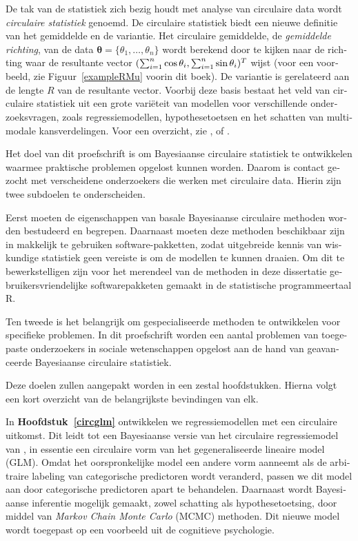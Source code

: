 \documentclass[12pt, a4paper]{book}\usepackage[]{graphicx}\usepackage{xcolor}
\let\proglang=\textsf
\begin{document}
\begin{otherlanguage}{dutch}
De tak van de statistiek zich bezig houdt met analyse van circulaire data wordt \textit{circulaire statistiek} genoemd. De circulaire statistiek biedt een nieuwe definitie van het gemiddelde en de variantie. Het circulaire gemiddelde, de \textit{gemiddelde richting}, van de data $\boldsymbol{\theta} = \{\theta_1, \dots, \theta_n\}$ wordt berekend door te kijken naar de richting waar de resultante vector $(\sum_{i=1}^n\cos\theta_i, \sum_{i=1}^n\sin\theta_i)^T$ wijst (voor een voorbeeld, zie Figuur~\ref{exampleRMu} voorin dit boek). De variantie is gerelateerd aan de lengte $R$ van de resultante vector. Voorbij deze basis bestaat het veld van circulaire statistiek uit een grote vari\"eteit van modellen voor verschillende onderzoeksvragen, zoals regressiemodellen, hypothesetoetsen en het schatten van multimodale kansverdelingen. Voor een overzicht, zie \citet{fisher1995statistical}, \citet{mardia2009directional} of \citet{pewsey2013circular}.

Het doel van dit proefschrift is om Bayesiaanse circulaire statistiek te ontwikkelen waarmee praktische problemen opgelost kunnen worden. Daarom is contact gezocht met verscheidene onderzoekers die werken met circulaire data. Hierin zijn twee subdoelen te onderscheiden.

Eerst moeten de eigenschappen van basale Bayesiaanse circulaire methoden worden bestudeerd en begrepen. Daarnaast moeten deze methoden beschikbaar zijn in makkelijk te gebruiken software-pakketten, zodat uitgebreide kennis van wiskundige statistiek geen vereiste is om de modellen te kunnen draaien. Om dit te bewerkstelligen zijn voor het merendeel van de methoden in deze dissertatie gebruikersvriendelijke softwarepakketen gemaakt in de statistische programmeertaal \proglang{R}.

Ten tweede is het belangrijk om gespecialiseerde methoden te ontwikkelen voor specifieke problemen. In dit proefschrift worden een aantal problemen van toegepaste onderzoekers in sociale wetenschappen opgelost aan de hand van geavanceerde Bayesiaanse circulaire statistiek.

Deze doelen zullen aangepakt worden in een zestal hoofdstukken. Hierna volgt een kort overzicht van de belangrijkste bevindingen van elk.

In \textbf{Hoofdstuk~\ref{circglm}} ontwikkelen we regressiemodellen met een circulaire uitkomst. Dit leidt tot een Bayesiaanse versie van het circulaire regressiemodel van \citet{fisher1992regression}, in essentie een circulaire vorm van het gegeneraliseerde lineaire model (GLM). Omdat het oorspronkelijke model een andere vorm aanneemt als de arbitraire labeling van categorische predictoren wordt veranderd, passen we dit model aan door categorische predictoren apart te behandelen. Daarnaast wordt Bayesiaanse inferentie mogelijk gemaakt, zowel schatting als hypothesetoetsing, door middel van \textit{Markov Chain Monte Carlo} (MCMC) methoden. Dit nieuwe model wordt toegepast op een voorbeeld uit de cognitieve psychologie.


\end{otherlanguage}
\end{document}
